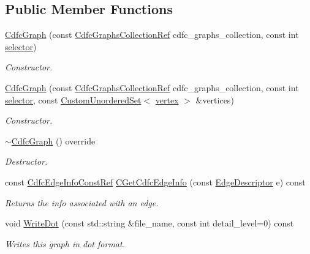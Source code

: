 \subsection*{Public Member Functions}
\begin{DoxyCompactItemize}
\item 
\hyperlink{classCdfcGraph_abf5ddb6772ee79d04c35dfbe9ab54b0a}{Cdfc\+Graph} (const \hyperlink{cdfc__module__binding_8hpp_aa8241ce8a2e9cbbcde3671221c69040a}{Cdfc\+Graphs\+Collection\+Ref} cdfc\+\_\+graphs\+\_\+collection, const int \hyperlink{structgraph_ab06c362711200ca8c15e3d85fef7957b}{selector})
\begin{DoxyCompactList}\small\item\em Constructor. \end{DoxyCompactList}\item 
\hyperlink{classCdfcGraph_ada9310c8cca38c92987b67c072d7b8d5}{Cdfc\+Graph} (const \hyperlink{cdfc__module__binding_8hpp_aa8241ce8a2e9cbbcde3671221c69040a}{Cdfc\+Graphs\+Collection\+Ref} cdfc\+\_\+graphs\+\_\+collection, const int \hyperlink{structgraph_ab06c362711200ca8c15e3d85fef7957b}{selector}, const \hyperlink{classCustomUnorderedSet}{Custom\+Unordered\+Set}$<$ \hyperlink{graph_8hpp_abefdcf0544e601805af44eca032cca14}{vertex} $>$ \&vertices)
\begin{DoxyCompactList}\small\item\em Constructor. \end{DoxyCompactList}\item 
\hyperlink{classCdfcGraph_ae050a935749d02ffedae2902ae06c8ed}{$\sim$\+Cdfc\+Graph} () override
\begin{DoxyCompactList}\small\item\em Destructor. \end{DoxyCompactList}\item 
const \hyperlink{cdfc__module__binding_8hpp_a0686d0b8dd408eaece6cf487f847ae30}{Cdfc\+Edge\+Info\+Const\+Ref} \hyperlink{classCdfcGraph_a0f52c6080324455730103c8a7a634d40}{C\+Get\+Cdfc\+Edge\+Info} (const \hyperlink{graph_8hpp_a9eb9afea34e09f484b21f2efd263dd48}{Edge\+Descriptor} e) const
\begin{DoxyCompactList}\small\item\em Returns the info associated with an edge. \end{DoxyCompactList}\item 
void \hyperlink{classCdfcGraph_a018d7ee1154139dc49ea1bc823edea61}{Write\+Dot} (const std\+::string \&file\+\_\+name, const int detail\+\_\+level=0) const
\begin{DoxyCompactList}\small\item\em Writes this graph in dot format. \end{DoxyCompactList}\end{DoxyCompactItemize}
